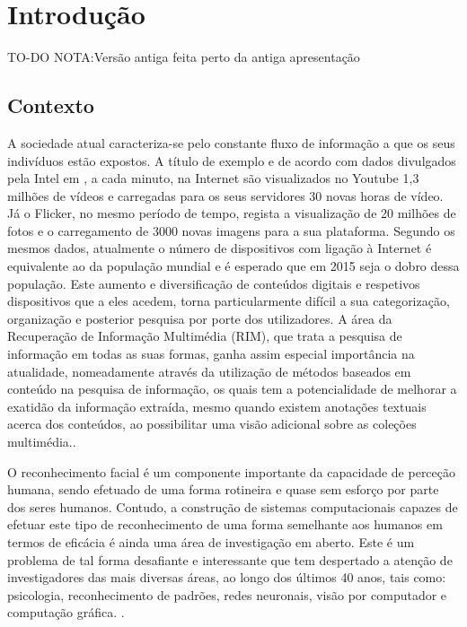 \chapter{Introdução} \label{chap:intro} TO-DO
NOTA:Versão antiga feita perto da antiga apresentação

\section{Contexto} \label{sec:context}

A sociedade atual caracteriza-se pelo constante fluxo de informação a que os seus indivíduos estão expostos. A título de exemplo e de acordo com dados divulgados pela Intel em \citep{IntelCorporation}, a cada minuto, na Internet são visualizados no Youtube 1,3 milhões de vídeos e carregadas para os seus servidores 30 novas horas de vídeo. Já o Flicker, no mesmo período de tempo, regista a visualização de 20 milhões de fotos e o carregamento de 3000 novas imagens para a sua plataforma.
Segundo os mesmos dados, atualmente o número de dispositivos com ligação à Internet é equivalente ao da população mundial e é esperado que em 2015 seja o dobro dessa população.
Este aumento e diversificação de conteúdos digitais e respetivos dispositivos que a eles acedem, torna particularmente difícil a sua categorização, organização e posterior pesquisa por porte dos utilizadores. A área da  Recuperação de Informação Multimédia (RIM), que trata a pesquisa de informação em todas as suas formas, ganha assim especial importância na atualidade, nomeadamente através da utilização de métodos baseados em conteúdo na pesquisa de informação, os quais tem a potencialidade de melhorar a exatidão da informação extraída, mesmo quando existem anotações textuais acerca dos conteúdos, ao possibilitar uma visão adicional sobre as coleções multimédia.\citep{Lew2006}.

O reconhecimento facial é um componente importante da capacidade de perceção humana, sendo efetuado de uma forma rotineira e quase sem esforço por parte dos seres humanos. Contudo, a construção de sistemas computacionais capazes de efetuar este tipo de reconhecimento de uma forma semelhante aos humanos em termos de eficácia é ainda uma área de investigação em aberto. Este é um problema de tal forma desafiante e interessante que tem despertado a atenção de investigadores das mais diversas áreas, ao longo dos últimos 40 anos, tais como: psicologia, reconhecimento de padrões, redes neuronais, visão por computador e computação gráfica. \citep{Zhao2003}.

